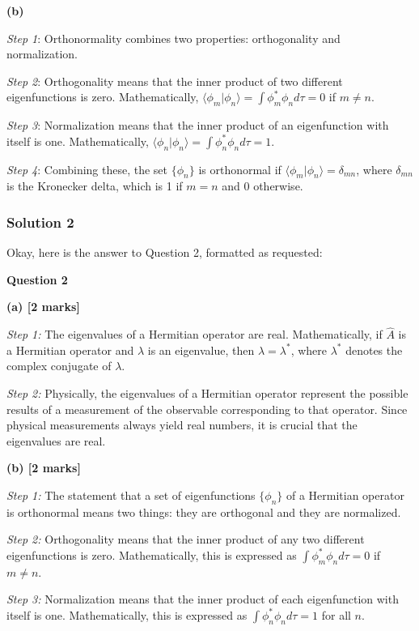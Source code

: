 \documentclass{article}
\begin{document}
\textbf{(b)}

\textit{Step 1}: Orthonormality combines two properties: orthogonality and normalization.

\textit{Step 2}: Orthogonality means that the inner product of two different eigenfunctions is zero. Mathematically, $\langle \phi_m | \phi_n \rangle = \int \phi_m^* \phi_n d\tau = 0$ if $m \neq n$.

\textit{Step 3}: Normalization means that the inner product of an eigenfunction with itself is one. Mathematically, $\langle \phi_n | \phi_n \rangle = \int \phi_n^* \phi_n d\tau = 1$.

\textit{Step 4}: Combining these, the set $\{\phi_n\}$ is orthonormal if $\langle \phi_m | \phi_n \rangle = \delta_{mn}$, where $\delta_{mn}$ is the Kronecker delta, which is 1 if $m=n$ and 0 otherwise.


\subsubsection{Solution 2}
Okay, here is the answer to Question 2, formatted as requested:

\textbf{Question 2}

\textbf{(a) [2 marks]}

\textit{Step 1:} The eigenvalues of a Hermitian operator are real. Mathematically, if $\hat{A}$ is a Hermitian operator and $\lambda$ is an eigenvalue, then $\lambda = \lambda^*$, where $\lambda^*$ denotes the complex conjugate of $\lambda$.

\textit{Step 2:} Physically, the eigenvalues of a Hermitian operator represent the possible results of a measurement of the observable corresponding to that operator. Since physical measurements always yield real numbers, it is crucial that the eigenvalues are real.

\textbf{(b) [2 marks]}

\textit{Step 1:} The statement that a set of eigenfunctions $\{\phi_n\}$ of a Hermitian operator is orthonormal means two things: they are orthogonal and they are normalized.

\textit{Step 2:} Orthogonality means that the inner product of any two different eigenfunctions is zero. Mathematically, this is expressed as $\int \phi_m^* \phi_n d\tau = 0$ if $m \neq n$.

\textit{Step 3:} Normalization means that the inner product of each eigenfunction with itself is one. Mathematically, this is expressed as $\int \phi_n^* \phi_n d\tau = 1$ for all $n$.
\end{document}
